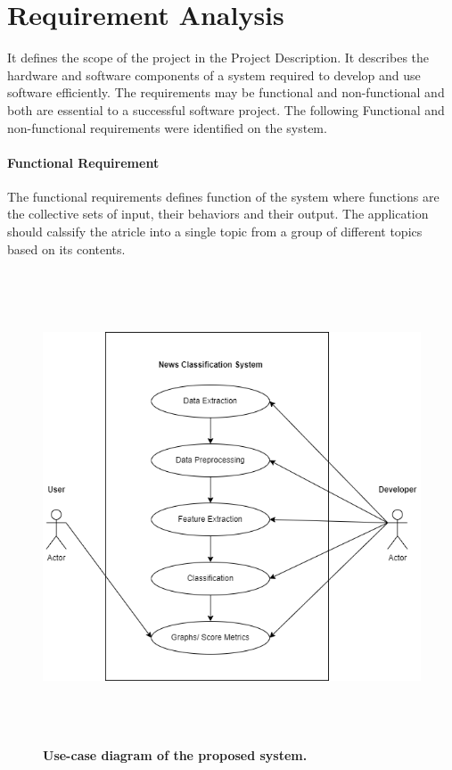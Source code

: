 \documentclass[12pt]{report}
\begin{document}
            \section{Requirement Analysis}
            It defines the scope of the project in the Project Description. It describes the hardware and software components of a system required to develop and use software 
            efficiently.
            The requirements may be functional and non-functional and both are essential to a successful software project. 
            The following Functional and non-functional requirements were identified on the system.

                \paragraph{Functional Requirement}
                The functional requirements defines function of the system where functions are the collective sets of
                input, their behaviors and their output.
                    The application should calssify the atricle into a single topic from a group of different topics based on its contents.
                    \begin{figure}[h]
                        \centering
                        \includegraphics[width=15.29cm, height=14cm]{usecase.png}
                        \caption{\textbf{Use-case diagram of the proposed system.}}
                    \end{figure}
                    \newpage 
                    
\end{document}
